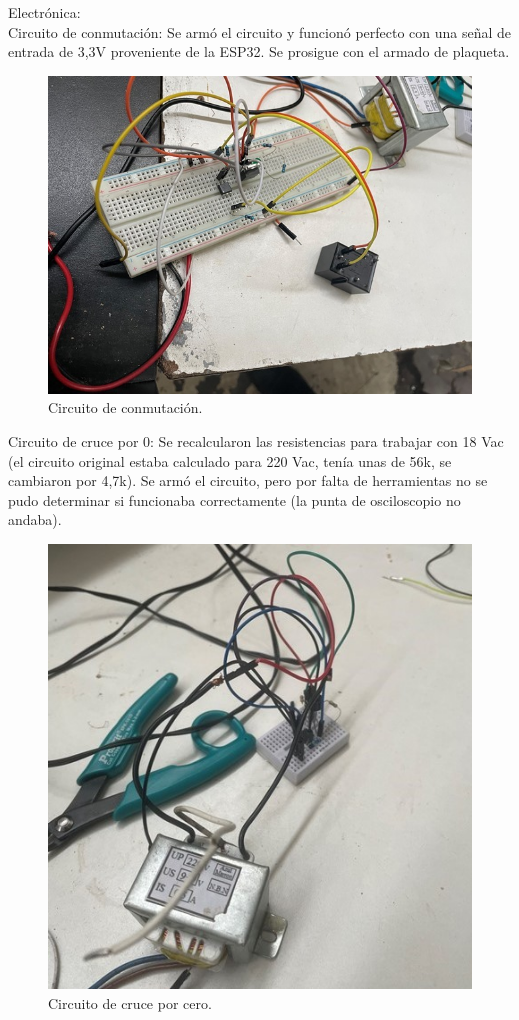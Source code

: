 Electrónica:\\

Circuito de conmutación: Se armó el circuito y funcionó perfecto con una señal de entrada de 3,3V proveniente de la ESP32. Se prosigue con el armado de plaqueta.\\

\begin{figure}[H]
    \centering
    \includegraphics[width=0.75\linewidth]{informes/IMG_8017.jpg}
    \caption{Circuito de conmutación.}
\end{figure}

Circuito de cruce por 0: Se recalcularon las resistencias para trabajar con 18 Vac (el circuito original estaba calculado para 220 Vac, tenía unas de 56k, se cambiaron por 4,7k). Se armó el circuito, pero por falta de herramientas no se pudo determinar si funcionaba correctamente (la punta de osciloscopio no andaba).\\

\begin{figure}[H]
    \centering
    \includegraphics[width=0.65\linewidth]{informes/IMG_8016.jpg}
    \caption{Circuito de cruce por cero.}
\end{figure}

